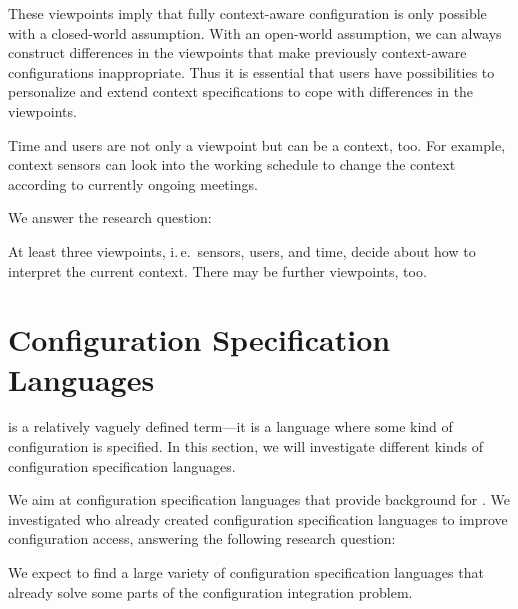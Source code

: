 These viewpoints imply that fully context-aware configuration is only possible with a closed-world assumption.
With an open-world assumption, we can always construct differences in the viewpoints that make previously context-aware configurations inappropriate.
Thus it is essential that users have possibilities to personalize and extend context specifications to cope with differences in the viewpoints.

Time and users are not only a viewpoint but can be a context, too.
For example, context sensors can look into the working schedule to change the context according to currently ongoing meetings.

We answer the research question:
\rqBackgroundViewpoints*
\begin{finding}
At least three viewpoints, i.\,e.\ sensors, users, and time, decide about how to interpret the current context.
There may be further viewpoints, too.
\end{finding}





























\section {Configuration Specification Languages}

is a relatively vaguely defined term---it is a language where some kind of configuration is specified.
In this section, we will investigate different kinds of configuration specification languages.

We aim at configuration specification languages that provide background for .
We investigated who already created configuration specification languages to improve configuration access, answering the following research question:
\rqBackgroundSpecificationLanguages*

\begin{hypothesis}
We expect to find a large variety of configuration specification languages that already solve some parts of the configuration integration problem.
\end{hypothesis}

